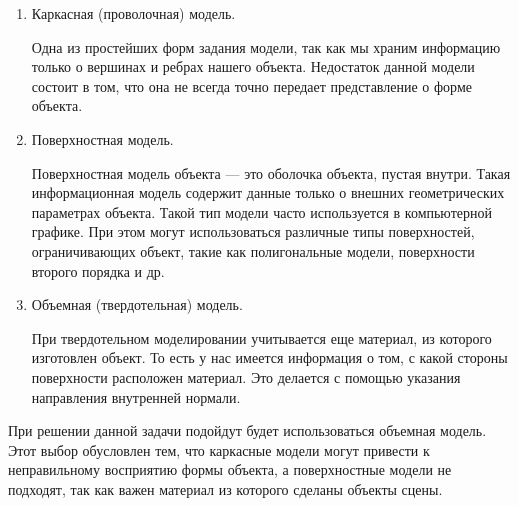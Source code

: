 \begin{enumerate}
	\item Каркасная (проволочная) модель.
	
	Одна из простейших форм задания модели, так как мы храним информацию только о вершинах и ребрах нашего объекта. Недостаток данной модели состоит в том, что она не всегда точно передает представление о форме объекта.
	
	\item Поверхностная модель.
	
	Поверхностная модель объекта --- это оболочка объекта, пустая внутри. Такая информационная модель содержит данные только о внешних геометрических параметрах объекта. Такой тип модели часто используется в компьютерной графике. При этом могут использоваться различные типы поверхностей, ограничивающих объект, такие как полигональные модели, поверхности второго порядка и др.
	
	\item  Объемная (твердотельная) модель.
	
	При твердотельном моделировании учитывается еще материал, из которого изготовлен объект. То есть у нас имеется информация о том, с какой стороны поверхности расположен материал. Это делается с помощью указания направления внутренней нормали.
	
\end{enumerate}

При решении данной задачи подойдут будет использоваться объемная модель. Этот выбор обусловлен тем, что каркасные модели могут привести к неправильному восприятию формы объекта, а поверхностные модели не подходят, так как важен материал из которого сделаны объекты сцены.

